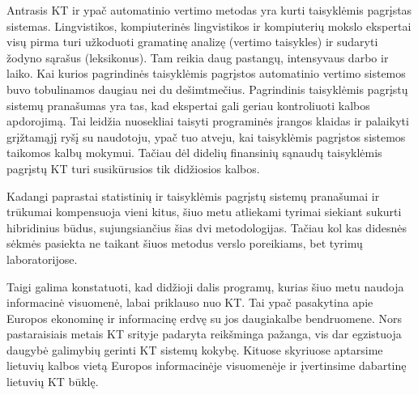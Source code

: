 \begin{multicols}{2}
Antrasis KT ir ypač automatinio vertimo metodas yra kurti taisyklėmis pagrįstas sistemas. Lingvistikos, kompiuterinės lingvistikos ir kompiuterių mokslo ekspertai visų pirma turi užkoduoti gramatinę analizę (vertimo taisykles) ir sudaryti žodyno sąrašus (leksikonus). Tam reikia daug pastangų, intensyvaus darbo ir laiko. Kai kurios pagrindinės taisyklėmis pagrįstos automatinio vertimo sistemos buvo tobulinamos daugiau nei du dešimtmečius. Pagrindinis taisyklėmis pagrįstų sistemų pranašumas yra tas, kad ekspertai gali geriau kontroliuoti kalbos apdorojimą. Tai leidžia nuosekliai taisyti programinės įrangos klaidas ir palaikyti grįžtamąjį ryšį su naudotoju, ypač tuo atveju, kai taisyklėmis pagrįstos sistemos taikomos kalbų mokymui. Tačiau dėl didelių finansinių sąnaudų taisyklėmis pagrįstų KT turi susikūrusios tik didžiosios kalbos. 

Kadangi paprastai statistinių ir taisyklėmis pagrįstų sistemų pranašumai ir trūkumai kompensuoja vieni kitus, šiuo metu atliekami tyrimai siekiant sukurti hibridinius būdus, sujungsiančius šias dvi metodologijas. Tačiau kol kas didesnės sėkmės pasiekta ne taikant šiuos metodus verslo poreikiams, bet tyrimų laboratorijose. 

Taigi galima konstatuoti, kad didžioji dalis programų, kurias šiuo metu naudoja informacinė visuomenė, labai priklauso nuo KT. Tai ypač pasakytina apie Europos ekonominę ir informacinę erdvę su jos daugiakalbe bendruomene. Nors pastaraisiais metais KT srityje padaryta reikšminga pažanga, vis dar egzistuoja daugybė galimybių gerinti KT sistemų kokybę. Kituose skyriuose aptarsime lietuvių kalbos vietą Europos informacinėje visuomenėje ir įvertinsime dabartinę lietuvių KT būklę.
\end{multicols}

\clearpage



